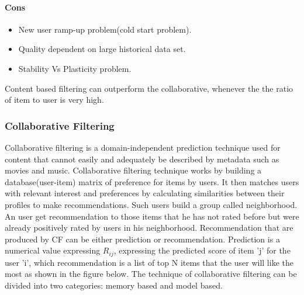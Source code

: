 \paragraph{Cons}\hfill
\begin{itemize}
\item New user ramp-up problem(cold start problem).
\item Quality dependent on large historical data set.
\item Stability Vs Plasticity problem.

\end{itemize}
Content based filtering can outperform the collaborative, whenever the the ratio of item to user is very high.
\subsubsection{Collaborative Filtering}
Collaborative filtering \cite{rmain}is a domain-independent prediction technique used for content that cannot easily and adequately be described by metadata such as movies and music. Collaborative filtering technique works by building a database(user-item) matrix of preference for items by users. It then matches users with relevant interest and preferences by calculating similarities between their profiles to make recommendations. Such users build a group called neighborhood. An user get recommendation to those items that he has not rated before but were already positively rated by users in his neighborhood. Recommendation that are produced by CF can be either prediction or recommendation. Prediction is a numerical value expressing $R_{ij}$, expressing the predicted score of item 'j' for the user 'i', which recommendation is a list of top N items that the user will like the most as shown in the figure below. The technique of collaborative filtering can be divided into two categories: memory based and model based. 

